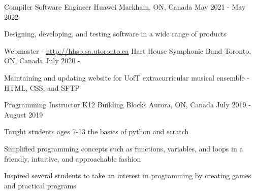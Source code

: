 

\begin{cventries}

  \cventry
  {Compiler Software Engineer}
  {Huawei}
  {Markham, ON, Canada}
  {May 2021 - May 2022}
  {
    \begin{cvitems}
      \item {Designing, developing, and testing software in a wide range of products }
    \end{cvitems}
  }

  \cventry
  {Webmaster - \url{http://hhsb.sa.utoronto.ca}} %
  {Hart House Symphonic Band} %
  {Toronto, ON, Canada} %
  {July 2020 - } %
  {
    \begin{cvitems} %
      \item {Maintaining and updating website for UofT extracurricular musical ensemble - HTML, CSS, and SFTP}
    \end{cvitems}
  }

  \cventry
  {Programming Instructor} %
  {K12 Building Blocks} %
  {Aurora, ON, Canada} %
  {July 2019 - August 2019} %
  {
    \begin{cvitems} %
      \item {Taught students ages 7-13 the basics of python and scratch}
      \item { Simplified programming concepts such as functions, variables, and loops in a friendly, intuitive, and approachable fashion}
      \item {Inspired several students to take an interest in programming by creating games and practical programs}
    \end{cvitems}
  }

\end{cventries}